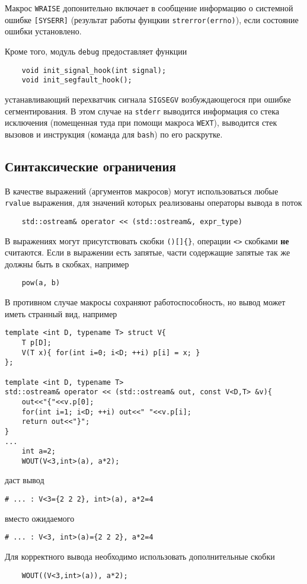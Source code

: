 Макрос \verb'WRAISE' допонительно включает в сообщение информацию о системной ошибке \verb'[SYSERR]' (результат работы
фунцкии \verb'strerror(errno)'), если состояние ошибки установлено.

Кроме того, модуль \verb'debug' предоставляет функции
\begin{verbatim}
    void init_signal_hook(int signal);
    void init_segfault_hook();
\end{verbatim}
устанавливающий перехватчик сигнала \verb'SIGSEGV' возбуждающегося при ошибке сегментирования. В этом случае на \verb'stderr' выводится информация со стека исключения
(помещенная туда при помощи макроса \verb'WEXT'), выводится стек вызовов и инструкция (команда для \verb'bash') по его раскрутке. 

\subsection{Синтаксические ограничения}
В качестве выражений (аргументов макросов) могут использоваться любые \verb'rvalue' выражения,
для значений которых реализованы операторы
вывода в поток
\begin{verbatim}
    std::ostream& operator << (std::ostream&, expr_type)
\end{verbatim}

В выражениях могут присутствовать скобки \verb'()[]{}', операции \verb'<>' скобками {\bf не} считаются.
Если в выражении есть запятые, части содержащие запятые так же должны быть в скобках, например
\begin{verbatim}
    pow(a, b)   
\end{verbatim}
В противном случае макросы сохраняют работоспособность, но вывод может иметь странный вид, например
\begin{verbatim}
template <int D, typename T> struct V{
    T p[D];
    V(T x){ for(int i=0; i<D; ++i) p[i] = x; }
};

template <int D, typename T> 
std::ostream& operator << (std::ostream& out, const V<D,T> &v){
    out<<"{"<<v.p[0];
    for(int i=1; i<D; ++i) out<<" "<<v.p[i];
    return out<<"}";
}
...
    int a=2;
    WOUT(V<3,int>(a), a*2);
\end{verbatim}
даст вывод
\begin{verbatim}
# ... : V<3={2 2 2}, int>(a), a*2=4
\end{verbatim}
вместо ожидаемого
\begin{verbatim}
# ... : V<3, int>(a)={2 2 2}, a*2=4
\end{verbatim}
Для корректного вывода необходимо использовать дополнительные скобки
\begin{verbatim}
    WOUT((V<3,int>(a)), a*2);
\end{verbatim}

